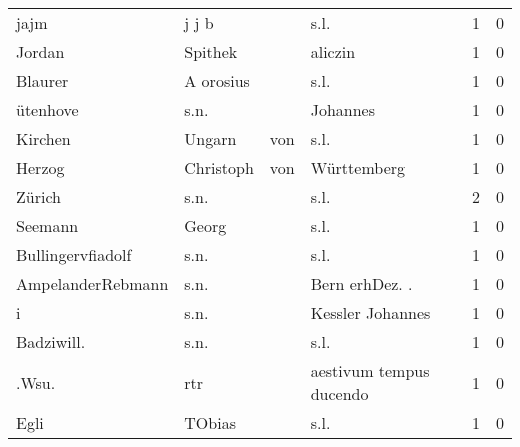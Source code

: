 \begin{center}
\begin{tiny}
\begin{longtabu}{llllrr}
                     jajm &                              j j b &             &                                        s.l. &          1 &         0 \\
                   Jordan &                            Spithek &             &                                     aliczin &          1 &         0 \\
                  Blaurer &                          A orosius &             &                                        s.l. &          1 &         0 \\
                 ütenhove &                               s.n. &             &                                    Johannes &          1 &         0 \\
                  Kirchen &                             Ungarn &         von &                                        s.l. &          1 &         0 \\
                   Herzog &                          Christoph &         von &                                 Württemberg &          1 &         0 \\
                   Zürich &                               s.n. &             &                                        s.l. &          2 &         0 \\
                  Seemann &                              Georg &             &                                        s.l. &          1 &         0 \\
        Bullingervfiadolf &                               s.n. &             &                                        s.l. &          1 &         0 \\
        AmpelanderRebmann &                               s.n. &             &                             Bern erhDez. .  &          1 &         0 \\
                        i &                               s.n. &             &                            Kessler Johannes &          1 &         0 \\
               Badziwill. &                               s.n. &             &                                        s.l. &          1 &         0 \\
                    .Wsu. &                                rtr &             &                     aestivum tempus ducendo &          1 &         0 \\
                     Egli &                             TObias &             &                                        s.l. &          1 &         0 \\

\end{longtabu}
\end{tiny}
\end{center}
